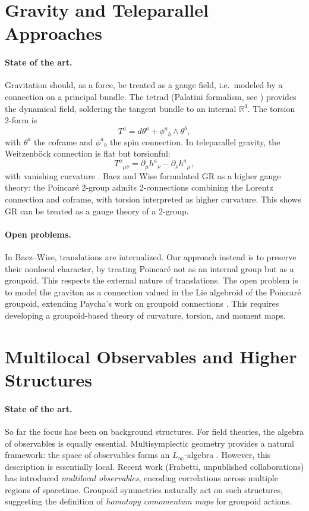 \documentclass[11pt,a4paper]{article}
\begin{document}
\section{Gravity and Teleparallel Approaches}

\paragraph{State of the art.}
Gravitation should, as a force, be treated as a gauge field, i.e.~modeled by a connection on a principal bundle. The tetrad (Palatini formalism, see \cite{WikipediaFrameFields}) provides the dynamical field, soldering the tangent bundle to an internal $\mathbb{R}^4$. The torsion 2-form is
$$
T^a = d\theta^a + \phi^a{}_b \wedge \theta^b,
$$
with $\theta^a$ the coframe and $\phi^a{}_b$ the spin connection. In teleparallel gravity, the Weitzenböck connection is flat but torsionful:
$$
T^a{}_{\mu\nu} = \partial_\mu h^a{}_\nu - \partial_\nu h^a{}_\mu,
$$
with vanishing curvature \cite{nLabTeleparallel}. Baez and Wise \cite{BaezWise} formulated GR as a higher gauge theory: the Poincaré 2-group admits 2-connections combining the Lorentz connection and coframe, with torsion interpreted as higher curvature. This shows GR can be treated as a gauge theory of a 2-group.

\paragraph{Open problems.}
In Baez–Wise, translations are internalized. Our approach instead is to preserve their nonlocal character, by treating Poincaré not as an internal group but as a groupoid. This respects the external nature of translations. The open problem is to model the graviton as a connection valued in the Lie algebroid of the Poincaré groupoid, extending Paycha’s work on groupoid connections \cite{PaychaUnpublished}. This requires developing a groupoid-based theory of curvature, torsion, and moment maps.

\section{Multilocal Observables and Higher Structures}

\paragraph{State of the art.}
So far the focus has been on background structures. For field theories, the algebra of observables is equally essential. Multisymplectic geometry provides a natural framework: the space of observables forms an $L_\infty$-algebra \cite{RogersLInfinity,CantrijnIbortDeLeon}. However, this description is essentially local. Recent work (Frabetti, unpublished collaborations) has introduced \emph{multilocal observables}, encoding correlations across multiple regions of spacetime. Groupoid symmetries naturally act on such structures, suggesting the definition of \emph{homotopy comomentum maps} for groupoid actions.
\end{document}

